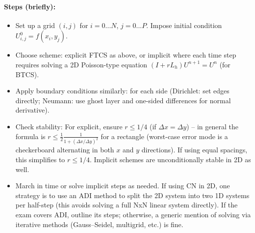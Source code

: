 \documentclass[a4paper,11pt]{article}
\begin{document}
\paragraph{Steps (briefly):}
\begin{itemize}
    \item Set up a grid $(i,j)$ for $i=0...N$, $j=0...P$. Impose initial condition $U_{i,j}^0 = f(x_i,y_j)$.
    \item Choose scheme: explicit FTCS as above, or implicit where each time step requires solving a 2D Poisson-type equation $(I + rL_h)U^{n+1} = U^n$ (for BTCS).
    \item Apply boundary conditions similarly: for each side (Dirichlet: set edges directly; Neumann: use ghost layer and one-sided differences for normal derivative).
    \item Check stability: For explicit, ensure $r \le 1/4$ (if $\Delta x = \Delta y$) -- in general the formula is $r \le \frac{1}{2}\frac{1}{1 + (\Delta x/\Delta y)^2}$ for a rectangle (worst-case error mode is a checkerboard alternating in both $x$ and $y$ directions). If using equal spacings, this simplifies to $r\le 1/4$. Implicit schemes are unconditionally stable in 2D as well.
    \item March in time or solve implicit steps as needed. If using CN in 2D, one strategy is to use an ADI method to split the 2D system into two 1D systems per half-step (this avoids solving a full NxN linear system directly). If the exam covers ADI, outline its steps; otherwise, a generic mention of solving via iterative methods (Gauss--Seidel, multigrid, etc.) is fine.
\end{itemize}
\end{document}
